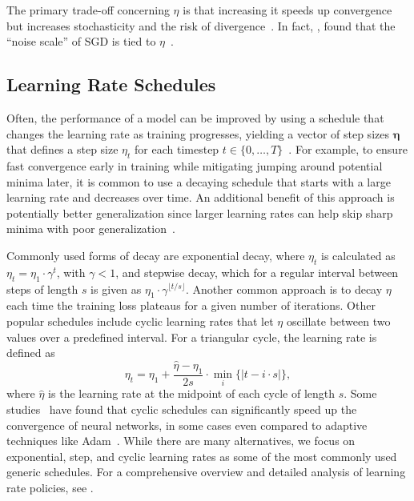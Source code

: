 \documentclass{article} %
\begin{document}
The primary trade-off concerning $\eta$ is that increasing it speeds up convergence but increases stochasticity and the risk of divergence~\citep{bengioPracticalRecommendationsGradientbased2012}.
In fact, \citet{smithBayesianPerspectiveGeneralization2018}, found that the “noise scale” of SGD is tied to $\eta$~\citep{smithBayesianPerspectiveGeneralization2018}.

\subsection{Learning Rate Schedules}

Often, the performance of a model can be improved by using a schedule that changes the learning rate as training progresses, yielding a vector of step sizes $\bm{\eta}$ that defines a step size $\eta_t$ for each timestep $t \in \{0, \ldots, T\}$~\citep{wuDemystifyingLearningRate2019b}.
For example, to ensure fast convergence early in training while mitigating jumping around potential minima later, it is common to use a decaying schedule that starts with a large learning rate and decreases over time.
An additional benefit of this approach is potentially better generalization since larger learning rates can help skip sharp minima with poor generalization~\citep{hochreiterFlatMinima1997,chaudhariEntropySGDBiasingGradient2017}.

Commonly used forms of decay are exponential decay, where $\eta_{t}$ is calculated as
$\eta_{t} = \eta_1 \cdot \gamma^t$,
with $\gamma < 1$, and stepwise decay, which for a regular interval between steps of length $s$ is given as $\eta_1 \cdot \gamma^{\lfloor t/s \rfloor}$.
Another common approach is to decay $\eta$ each time the training loss plateaus for a given number of iterations. Other popular schedules include cyclic learning rates that let $\eta$ oscillate between two values over a predefined interval.
For a triangular cycle, the learning rate is defined as
\begin{equation}
   \eta_t = \eta_1 + \frac{\hat{\eta} - \eta_1}{2s} \cdot \min_{i} \{|t-i\cdot s|\},
\end{equation}
where $\hat{\eta}$ is the learning rate at the midpoint of each cycle of length $s$.
Some studies~\citep{smithCyclicalLearningRates2017, smithSuperConvergenceVeryFast2018a} have found that cyclic schedules can significantly speed up the convergence of neural networks, in some cases even compared to adaptive techniques like Adam~\citep{kingmaAdamMethodStochastic2017b}.
While there are many alternatives, we focus on exponential, step, and cyclic learning rates as some of the most commonly used generic schedules.
For a comprehensive overview and detailed analysis of learning rate policies, see \citet{wuDemystifyingLearningRate2019b}.
\end{document}
